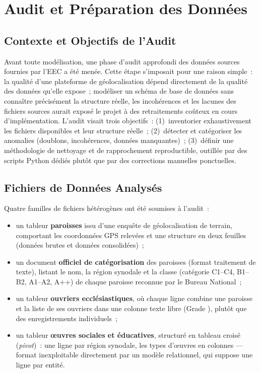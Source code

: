 \documentclass[12pt, a4paper]{report}
\begin{document}
\section{Audit et Préparation des Données}
\label{sec:audit-donnees}

\subsection{Contexte et Objectifs de l'Audit}

Avant toute modélisation, une phase d'audit approfondi des données sources
fournies par l'EEC a été menée. Cette étape s'imposait pour une raison
simple~: la qualité d'une plateforme de géolocalisation dépend directement
de la qualité des données qu'elle expose~; modéliser un schéma de base de
données sans connaître précisément la structure réelle, les incohérences et
les lacunes des fichiers sources aurait exposé le projet à des
retraitements coûteux en cours d'implémentation. L'audit visait trois
objectifs~: (1)~inventorier exhaustivement les fichiers disponibles et leur
structure réelle~; (2)~détecter et catégoriser les anomalies (doublons,
incohérences, données manquantes)~; (3)~définir une méthodologie de
nettoyage et de rapprochement reproductible, outillée par des scripts
Python dédiés plutôt que par des corrections manuelles ponctuelles.

\subsection{Fichiers de Données Analysés}

Quatre familles de fichiers hétérogènes ont été soumises à l'audit~:
\begin{itemize}[itemsep=2pt, topsep=4pt, leftmargin=1.5cm]
  \item un tableur \textbf{paroisses} issu d'une enquête de géolocalisation
    de terrain, comportant les coordonnées GPS relevées et une structure en
    deux feuilles (données brutes et données consolidées)~;
  \item un document \textbf{officiel de catégorisation} des paroisses
    (format traitement de texte), listant le nom, la région synodale et la
    classe (catégorie C1--C4, B1--B2, A1--A2, A++) de chaque paroisse
    reconnue par le Bureau National~;
  \item un tableur \textbf{ouvriers ecclésiastiques}, où chaque ligne
    combine une paroisse et la liste de ses ouvriers dans une colonne texte
    libre (\og Grade \fg{}), plutôt que des enregistrements individuels~;
  \item un tableur \textbf{œuvres sociales et éducatives}, structuré en
    tableau croisé (\textit{pivot})~: une ligne par région synodale, les
    types d'œuvres en colonnes --- format inexploitable directement par un
    modèle relationnel, qui suppose une ligne par entité.
\end{itemize}
\end{document}
